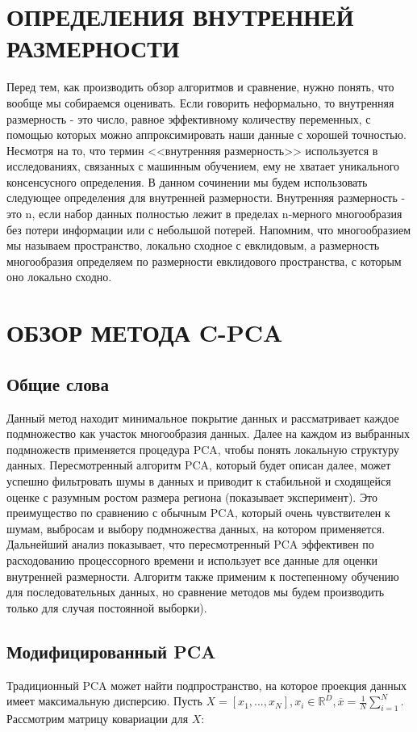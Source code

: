 \documentclass[english, russian]{sobraep}
\begin{document}
\section{ОПРЕДЕЛЕНИЯ ВНУТРЕННЕЙ РАЗМЕРНОСТИ}

Перед тем, как производить обзор алгоритмов и сравнение, нужно понять, что вообще мы собираемся оценивать. Если говорить неформально, то внутренняя размерность - это число, равное эффективному количеству переменных, с помощью которых можно аппроксимировать наши данные с хорошей точностью. Несмотря на то, что термин <<внутренняя размерность>> используется в исследованиях, связанных с машинным обучением, ему не хватает уникального консенсусного определения. В данном сочинении мы будем использовать следующее определения для внутренней размерности. Внутренняя размерность - это n, если набор данных полностью лежит в пределах n-мерного многообразия без потери информации или с небольшой потерей. Напомним, что многообразием мы называем пространство, локально сходное с евклидовым, а размерность многообразия определяем по размерности евклидового пространства, с которым оно локально сходно.

\section{ОБЗОР МЕТОДА C-PCA}

\subsection{Общие слова}
Данный метод находит минимальное покрытие данных и рассматривает каждое подмножество как участок многообразия данных. Далее на каждом из выбранных подмножеств применяется процедура PCA, чтобы понять локальную структуру данных. Пересмотренный алгоритм PCA, который будет описан далее, может успешно фильтровать шумы в данных и приводит к стабильной и сходящейся оценке с разумным ростом размера региона (показывает эксперимент). Это преимущество по сравнению с обычным PCA, который очень чувствителен к шумам, выбросам и выбору подмножества данных, на котором применяется. Дальнейший анализ показывает, что пересмотренный PCA эффективен по расходованию процессорного времени и использует все данные для оценки внутренней размерности. Алгоритм также применим к постепенному обучению для последовательных данных, но сравнение методов мы будем производить только для случая постоянной выборки). 

\subsection{Модифицированный PCA}
Традиционный PCA может найти подпространство, на которое проекция данных имеет максимальную дисперсию. Пусть $ X = [x_1, ..., x_N], x_i \in \mathbb {R}^{D},  \overline{x} = \frac{1}{N}\sum_{i=1}^N $. Рассмотрим матрицу ковариации для $X$: 
\end{document}
